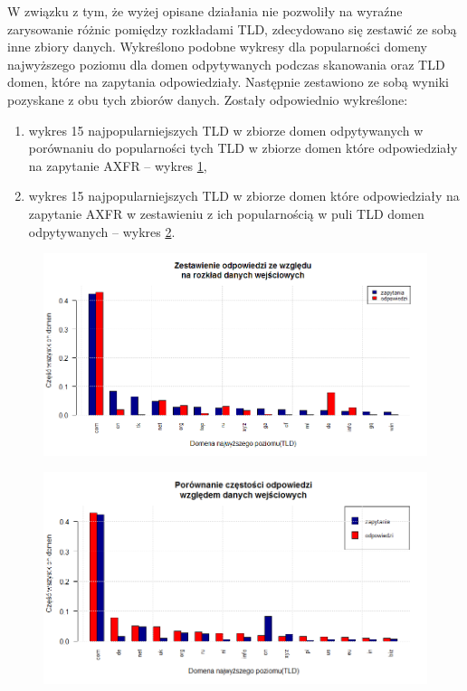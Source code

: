 W związku z tym, że wyżej opisane działania nie pozwoliły na wyraźne zarysowanie różnic pomiędzy rozkładami TLD, zdecydowano się zestawić ze sobą inne zbiory danych. Wykreślono podobne wykresy dla popularności domeny najwyższego poziomu dla domen odpytywanych podczas skanowania oraz TLD domen, które na zapytania odpowiedziały. Następnie zestawiono ze sobą wyniki pozyskane z obu tych zbiorów danych. Zostały odpowiednio wykreślone:
\begin{enumerate}
	\item wykres 15 najpopularniejszych TLD w zbiorze domen odpytywanych w porównaniu do popularności tych TLD w zbiorze domen które odpowiedziały na zapytanie AXFR -- wykres \ref{req_to_resp},
	\item wykres 15 najpopularniejszych TLD w zbiorze domen które odpowiedziały na zapytanie AXFR w zestawieniu z ich popularnością w puli TLD domen odpytywanych -- wykres \ref{resp_to_req}.
\end{enumerate}

\begin{figure}[ht]
	\centering
	\includegraphics[width=1.0\textwidth]{image/req_to_resp}
	\caption{}
	\label{req_to_resp}
\end{figure}

\begin{figure}[ht]
	\centering
	\includegraphics[width=1.0\textwidth]{image/resp_to_req}
	\caption{}
	\label{resp_to_req}
\end{figure}

